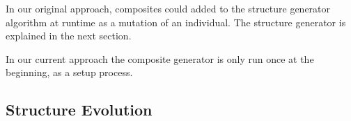 \documentclass[conference]{IEEEtran}
\begin{document}
    
    In our original approach, composites could added to the structure generator
    algorithm at runtime as a mutation of an individual. The structure generator
    is explained in the next section.

    
    In our current approach the composite generator is only
    run once at the beginning, as a setup process.
    

    \subsection{Structure Evolution}

    
\end{document}
